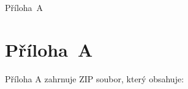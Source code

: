 \documentclass[a4paper]{ article}
\begin{document}
\noindent Příloha~A \dotfill \pageref{1}


\clearpage {}\label{prilohaA} 
\section*{Příloha~A}

Příloha A zahrnuje ZIP soubor, který obsahuje: 

\end{document}
